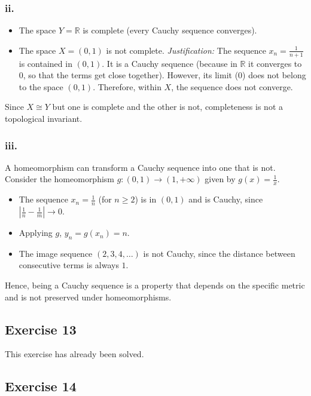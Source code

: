 \documentclass[11pt, a4paper]{article}
\begin{document}
\subsubsection*{ii.}
\begin{itemize}
    \item The space $Y = \mathbb{R}$ is complete (every Cauchy sequence converges).
    \item The space $X = (0, 1)$ is not complete.
    \textit{Justification:} The sequence $x_n = \frac{1}{n+1}$ is contained in $(0, 1)$. It is a
    Cauchy sequence (because in $\mathbb{R}$ it converges to 0, so that the terms get close together). However,
    its limit (0) does not belong to the space $(0, 1)$. Therefore, within $X$, the
    sequence does not converge.
\end{itemize}
Since $X \cong Y$ but one is complete and the other is not, completeness is not a topological invariant.

\subsubsection*{iii.}
A homeomorphism can transform a Cauchy sequence into one that is not. Consider the
homeomorphism $g: (0, 1) \to (1, +\infty)$ given by $g(x) = \frac{1}{x}$.

\begin{itemize}
    \item The sequence $x_n = \frac{1}{n}$ (for $n \ge 2$) is in $(0, 1)$ and is Cauchy, since
    $\left| \frac{1}{n} - \frac{1}{m} \right| \to 0$.
    \item Applying $g$, $y_n = g(x_n) = n$.
    \item The image sequence $(2, 3, 4, \dots)$ is not Cauchy, since the distance between consecutive
    terms is always $1$.
\end{itemize}
Hence, being a Cauchy sequence is a property that depends on the specific metric and is not
preserved under homeomorphisms.

\subsection*{Exercise 13}

This exercise has already been solved.

\subsection*{Exercise 14}
\end{document}
